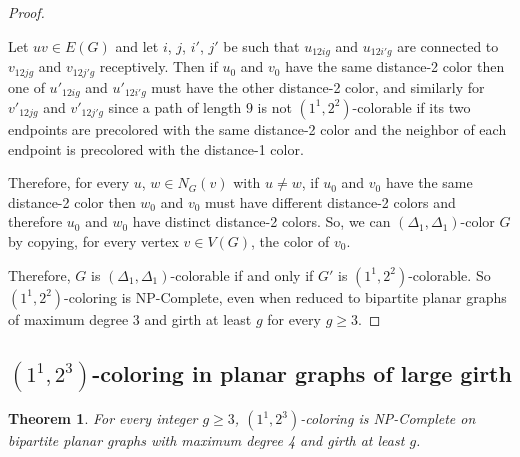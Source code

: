 \documentclass{article}
\newtheorem{theorem}{Theorem}
\newcommand{\colo}[2]{(1^{#1}, 2^{#2})}
\begin{document}
\begin{proof}
\begin{itemize}
        Let $uv \in E(G)$ and let $i$, $j$, $i'$, $j'$ be such that $u_{12ig}$ and $u_{12i'g}$ are connected to $v_{12jg}$ and $v_{12j'g}$ receptively. Then if $u_{0}$ and $v_{0}$ have the same distance-2 color then one of $u'_{12ig}$ and $u'_{12i'g}$ must have the other distance-2 color, and similarly for $v'_{12jg}$ and $v'_{12j'g}$ since a path  of length $9$ is not $\colo{1}{2}$-colorable if its two endpoints are precolored with the same distance-2 color and the neighbor of each endpoint is precolored with the distance-1 color. 
        
        Therefore, for every $u$, $w \in N_G(v)$ with $u \neq w$, if $u_0$ and $v_0$ have the same distance-2 color then $w_0$ and $v_0$ must have different distance-2 colors and therefore $u_0$ and $w_0$ have distinct distance-2 colors. So, we can $(\Delta_1, \Delta_1)$-color $G$ by copying, for every vertex $v \in V(G)$, the color of $v_0$.
    \end{itemize}
    Therefore, $G$ is $(\Delta_1, \Delta_1)$-colorable if and only if $G'$ is $\colo{1}{2}$-colorable. So {\sc $\colo{1}{2}$-coloring} is NP-Complete, even when reduced to bipartite planar graphs of maximum degree $3$ and girth at least $g$ for every $g \geq 3$.
\end{proof}


\subsection{{\sc $\colo{1}{3}$-coloring} in planar graphs of large girth}

\begin{theorem}\label{thm:npc_1_3_coloring_for_every_g}
    For every integer $g\geq 3$, {\sc $\colo{1}{3}$-coloring} is NP-Complete on bipartite planar graphs with maximum degree 4 and girth at least $g$.
\end{theorem}
\end{document}
